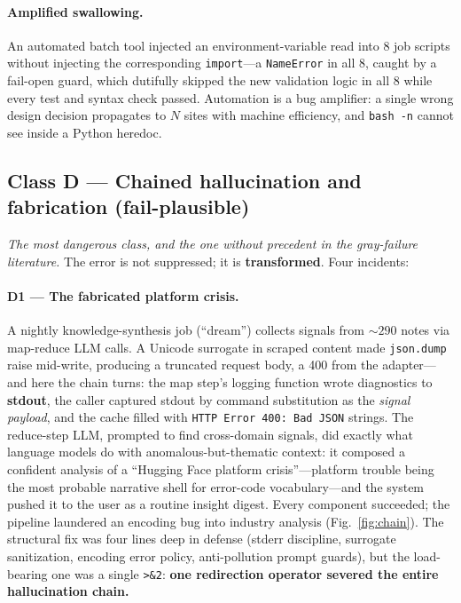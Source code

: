 \paragraph{Amplified swallowing.} An automated batch tool injected an
environment-variable read into 8 job scripts without injecting the
corresponding \texttt{import}---a \texttt{NameError} in all 8, caught by
a fail-open guard, which dutifully skipped the new validation logic in
all 8 while every test and syntax check passed. Automation is a bug
amplifier: a single wrong design decision propagates to $N$ sites with
machine efficiency, and \texttt{bash~-n} cannot see inside a Python
heredoc.

\subsection{Class D --- Chained hallucination and fabrication
(fail-plausible)}\label{sec:classd}

\emph{The most dangerous class, and the one without precedent in the
gray-failure literature.} The error is not suppressed; it is
\textbf{transformed}. Four incidents:

\paragraph{D1 --- The fabricated platform crisis.} A nightly
knowledge-synthesis job (``dream'') collects signals from ${\sim}290$
notes via map-reduce LLM calls. A Unicode surrogate in scraped content
made \texttt{json.dump} raise mid-write, producing a truncated request
body, a 400 from the adapter---and here the chain turns: the map step's
logging function wrote diagnostics to \textbf{stdout}, the caller
captured stdout by command substitution as the \emph{signal payload}, and
the cache filled with \texttt{HTTP Error 400: Bad JSON} strings. The
reduce-step LLM, prompted to find cross-domain signals, did exactly what
language models do with anomalous-but-thematic context: it composed a
confident analysis of a ``Hugging Face platform crisis''---platform
trouble being the most probable narrative shell for error-code
vocabulary---and the system pushed it to the user as a routine insight
digest. Every component succeeded; the pipeline laundered an encoding bug
into industry analysis (Fig.~\ref{fig:chain}). The structural fix was
four lines deep in defense (stderr discipline, surrogate sanitization,
encoding error policy, anti-pollution prompt guards), but the
load-bearing one was a single \texttt{>\&2}: \textbf{one redirection
operator severed the entire hallucination chain.}

